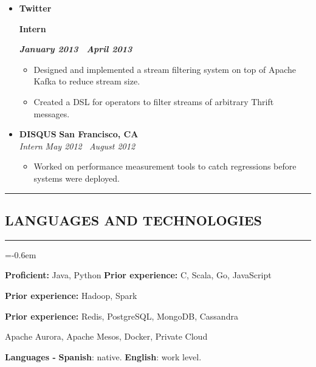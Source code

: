 \documentclass[10pt,letterpaper]{article}
\newcommand\textbox[1]{%
  \parbox{.333\textwidth}{#1}%
}
\newcommand{\CPP}
{C\nolinebreak[4]\hspace{-.05em}\raisebox{.22ex}{\footnotesize\bf ++}}
\newcommand{\sectionTitle}[1]{
  \hrule
  \vspace{-1.0em} 
  \subsection*{\uppercase{\textbf{#1}}}
  \vspace{-0.3em}
    \hrule
    \vspace{0.5em}  
}
\newcommand{\languageSection}[4]{
  \vspace{-0.5em}
  \begin{center}
    \textbf{Languages - } \textbf{#1}: #2. \textbf{#3}: #4.
  \end{center}
}
\newcommand{\titleExperienceWithoutLocation}[4]{
  \vspace{1.0em}
  \item[]
  {
    \textbox{\textbf{#1}\hfill}\textbox{\hfil \textbf{#2}\hfil}\hfill \textbf{\emph{#3 \textendash \ #4}}
  }
}
\newcommand{\titleExperienceWithLocation}[5]{
  \vspace{1.0em}
  \item[]
  {
    \textbf{#1} \hfill
    \textbf{#2}
  }
  \\{\emph{#3} \hfill \emph{#4 \textendash \ #5}}
}
\begin{document}
\begin{itemize}[leftmargin=*]
  \titleExperienceWithoutLocation{Twitter}{Intern}{January 2013}{April 2013}
    \begin{itemize}[label=\textbullet]
      \itemsep0em
      \item Designed and implemented a stream filtering system on top of Apache
      Kafka to reduce stream size.
      \item Created a DSL for operators to filter streams of arbitrary Thrift
      messages.
    \end{itemize}
    
  \titleExperienceWithLocation{DISQUS}{San Francisco, CA}{Intern}{May 2012}{August 2012}
    \begin{itemize}[label=\textbullet]
      \itemsep0em
      \item Worked on performance measurement tools to catch regressions before
      systems were deployed.
    \end{itemize}
    
  \end{itemize}
  

  
  \sectionTitle{Languages and Technologies}
  \vspace{0.5em}
  \begin{description}[labelindent=\parindent]
    \parskip=-0.6em
    \item [Languages:] \textbf{Proficient:} Java, Python \textbf{Prior experience:} \CPP, Scala, Go, JavaScript
    \item [Frameworks:] \textbf{Prior experience:} Hadoop, Spark
    \item [Databases:] \textbf{Prior experience:} Redis, PostgreSQL, MongoDB, Cassandra
    \item [Systems:] Apache Aurora, Apache Mesos, Docker, Private Cloud
  \end{description}
  
  \languageSection{Spanish}{native}{English}{work level}
  
\end{document}
